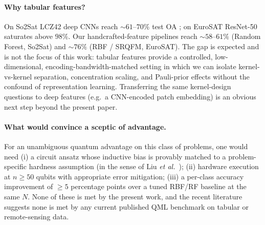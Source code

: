 \documentclass[pdflatex,sn-mathphys-num]{sn-jnl}
\theoremstyle{thmstyleone}
\theoremstyle{thmstyletwo}
\theoremstyle{thmstylethree}
\begin{document}
\paragraph{Why tabular features?}
On So2Sat LCZ42 deep CNNs reach $\sim\!61$--$70\%$ test OA
\cite{qiu2020}; on EuroSAT ResNet-50 saturates above $98\%$. Our
handcrafted-feature pipelines reach $\sim\!58$--$61\%$ (Random
Forest, So2Sat) and $\sim\!76\%$ (RBF / SRQFM, EuroSAT). The gap is
expected and is not the focus of this work: tabular features provide a
controlled, low-dimensional, encoding-bandwidth-matched setting in
which we can isolate kernel-vs-kernel separation, concentration
scaling, and Pauli-prior effects without the confound of
representation learning. Transferring the same kernel-design
questions to deep features (e.g.\ a CNN-encoded patch embedding) is
an obvious next step beyond the present paper.

\paragraph{What would convince a sceptic of advantage.}
For an unambiguous quantum advantage on this class of problems, one
would need (i) a circuit ansatz whose inductive bias is provably
matched to a problem-specific hardness assumption (in the sense of
Liu \emph{et al.}\ \cite{liu2021}); (ii) hardware execution at
$n\ge 50$ qubits with appropriate error mitigation; (iii) a per-class
accuracy improvement of $\ge 5$ percentage points over a tuned
RBF/RF baseline at the same $N$. None of these is met by the present
work, and the recent literature \cite{bowles2024,schnabel2025} suggests
none is met by any current published QML benchmark on tabular or
remote-sensing data.
\end{document}
